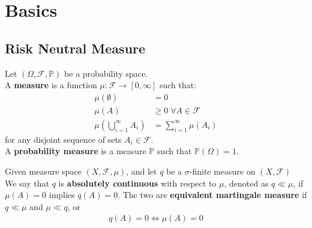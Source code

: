 \section{Basics}

\subsection{Risk Neutral Measure}

\begin{definition}
    Let $(\Omega, \mathcal{F}, \mathbb{P})$ be a probability space.\\
    A \textbf{measure} is a function $\mu: \mathcal{F} \to [0, \infty]$ such that:
    \begin{align*}
        \mu(\emptyset) &= 0\\
        \mu(A) &\geq 0 \; \forall A \in \mathcal{F}\\
        \mu(\bigcup_{i=1}^{\infty} A_i) &= \sum_{i=1}^{\infty} \mu(A_i)
    \end{align*}
    for any disjoint sequence of sets $A_i \in \mathcal{F}$.\\
    A \textbf{probability measure} is a measure $\mathbb{P}$ such that $\mathbb{P}(\Omega) = 1$.
\end{definition}

\begin{definition}
    Given measure space $(X, \mathcal{F}, \mu)$, and let $q$ be a $\sigma$-finite measure on $(X, \mathcal{F})$\\
    We say that $q$ is \textbf{absolutely continuous} with respect to $\mu$, denoted as $q \ll \mu$, if $\mu(A) = 0$ implies $q(A) = 0$.
    The two are \textbf{equivalent martingale measure} if $q \ll \mu$ and $\mu \ll q$, or
    \begin{align*}
        q(A) = 0 \iff \mu(A) = 0
    \end{align*}
\end{definition}

